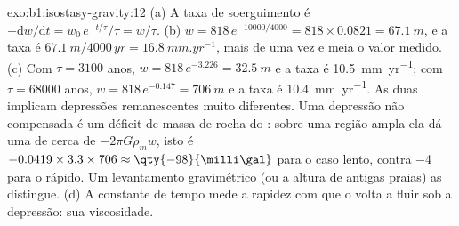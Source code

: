 \begin{solution}{exo:b1:isostasy-gravity:12}
(a) A taxa de soerguimento é $-\mathrm dw/\mathrm dt = w_0\,e^{-t/\tau}/\tau = w/\tau$.
(b) $w = 818\,e^{-10000/4000} = 818\times0.0821 = \qty{67.1}{m}$, e a taxa é
$\qty{67.1}{m}/\num{4000}\,\unit{yr} = \qty{16.8}{mm.yr^{-1}}$, mais de uma
vez e meia o valor medido. (c) Com $\tau = 3100$ anos, $w =
818\,e^{-3.226} = \qty{32.5}{m}$ e a taxa é \qty{10.5}{mm.yr^{-1}}; com
$\tau = \num{68000}$ anos, $w = 818\,e^{-0.147} = \qty{706}{m}$ e a taxa
é \qty{10.4}{mm.yr^{-1}}. As duas implicam depressões remanescentes muito diferentes.
Uma depressão não compensada é um déficit de massa de rocha do : sobre uma região ampla ela dá uma  de cerca de $-2\pi G\rho_m w$, isto é
$-0.0419\times3.3\times706 \approx \qty{-98}{\milli\gal}$ para o caso lento,
contra \qty{-4}{\milli\gal} para o rápido. Um levantamento gravimétrico (ou a altura de antigas praias) as distingue. (d) A constante de tempo mede a rapidez com que o 
volta a fluir sob a depressão: sua viscosidade.
\end{solution}

